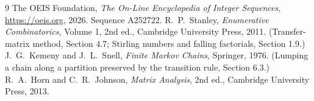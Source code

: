 \documentclass[11pt,a4paper]{article}
\theoremstyle{plain}
\theoremstyle{definition}
\begin{document}
\begin{thebibliography}{9}
 The OEIS Foundation, \emph{The On-Line Encyclopedia of Integer
Sequences}, \url{https://oeis.org}, 2026. Sequence A252722.
 R.~P.~Stanley, \emph{Enumerative Combinatorics}, Volume 1, 2nd ed.,
Cambridge University Press, 2011. (Transfer-matrix method, Section 4.7; Stirling numbers and
falling factorials, Section 1.9.)
 J.~G.~Kemeny and J.~L.~Snell, \emph{Finite Markov Chains}, Springer,
1976. (Lumping a chain along a partition preserved by the transition rule, Section 6.3.)
 R.~A.~Horn and C.~R.~Johnson, \emph{Matrix Analysis}, 2nd ed., Cambridge
University Press, 2013.
\end{thebibliography}
\end{document}

